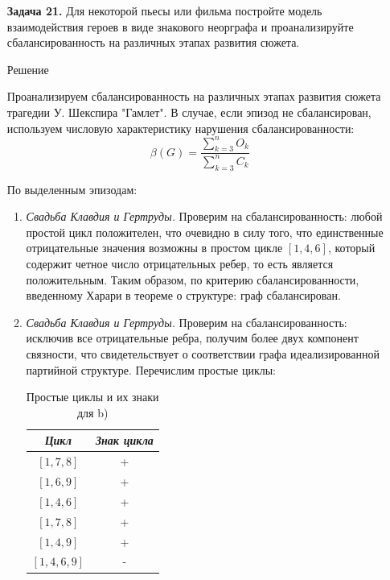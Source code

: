 \documentclass{article}
\begin{document}
\clearpage%
\begin{enumerate}
\item[\textbf{Задача 21.}]Для некоторой пьесы или фильма постройте модель взаимодействия героев в виде знакового неорграфа и проанализируйте сбалансированность на
различных этапах развития сюжета.
\\
\begin{center}
Решение 
\end{center}
Проанализируем сбалансированность на различных этапах развития сюжета трагедии У. Шекспира "Гамлет". В случае, если эпизод не сбалансирован, используем числовую характеристику нарушения сбалансированности:
\[ \beta(G) = \frac{\sum_{k=3}^{n} O_k}{\sum_{k=3}^{n} C_k} \]

По выделенным эпизодам:
    \begin{enumerate}
        \item \textit{Свадьба Клавдия и Гертруды.} Проверим на сбалансированность: любой простой цикл положителен, что очевидно в силу того, что единственные отрицательные значения возможны в простом цикле $[1,4,6]$, который содержит четное число отрицательных ребер, то есть является положительным. Таким образом, по критерию сбалансированности, введенному Харари в теореме о структуре: граф сбалансирован.
        
        \item \textit{Свадьба Клавдия и Гертруды.} Проверим на сбалансированность: исключив все отрицательные ребра, получим более двух компонент связности, что свидетельствует о соответствии графа идеализированной партийной структуре.
        Перечислим простые циклы:
        \begin{table}[ht]
        \centering
        \begin{tabular}{c|c}
            \textit{Цикл} & \textit{Знак цикла} \\ \hline
            $[1,7,8]$ & + \\
            $[1,6,9]$ & + \\
            $[1,4,6]$ & + \\
            $[1,7,8]$ & + \\
            $[1,4,9]$ & + \\
            $[1,4,6,9]$ & - \\ \hline
        \end{tabular}
        \caption{Простые циклы и их знаки для b)}
        \label{tab:21_cycles}
        \end{table}
        

\end{enumerate}
\end{enumerate}
\end{document}
